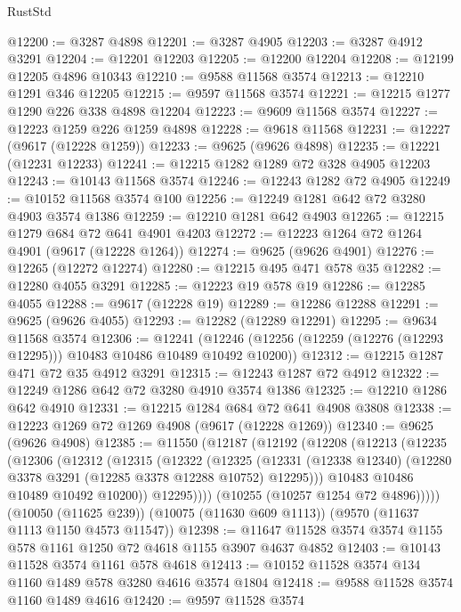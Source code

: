\begin{lexlean}{RustStd}
\begin{coremodule}
@12200 := @3287 @4898
@12201 := @3287 @4905
@12203 := @3287 @4912 @3291
@12204 := @12201 @12203
@12205 := @12200 @12204
@12208 := @12199 @12205 @4896 @10343
@12210 := @9588 @11568 @3574
@12213 := @12210 @1291 @346 @12205
@12215 := @9597 @11568 @3574
@12221 := @12215 @1277 @1290 @226 @338 @4898 @12204
@12223 := @9609 @11568 @3574
@12227 := @12223 @1259 @226 @1259 @4898
@12228 := @9618 @11568
@12231 := @12227 (@9617 (@12228 @1259))
@12233 := @9625 (@9626 @4898)
@12235 := @12221 (@12231 @12233)
@12241 := @12215 @1282 @1289 @72 @328 @4905 @12203
@12243 := @10143 @11568 @3574
@12246 := @12243 @1282 @72 @4905
@12249 := @10152 @11568 @3574 @100
@12256 := @12249 @1281 @642 @72 @3280 @4903 @3574 @1386
@12259 := @12210 @1281 @642 @4903
@12265 := @12215 @1279 @684 @72 @641 @4901 @4203
@12272 := @12223 @1264 @72 @1264 @4901 (@9617 (@12228 @1264))
@12274 := @9625 (@9626 @4901)
@12276 := @12265 (@12272 @12274)
@12280 := @12215 @495 @471 @578 @35
@12282 := @12280 @4055 @3291
@12285 := @12223 @19 @578 @19
@12286 := @12285 @4055
@12288 := @9617 (@12228 @19)
@12289 := @12286 @12288
@12291 := @9625 (@9626 @4055)
@12293 := @12282 (@12289 @12291)
@12295 := @9634 @11568 @3574
@12306 := @12241
    (@12246 (@12256 (@12259 (@12276 (@12293 @12295))) @10483 @10486 @10489 @10492 @10200))
@12312 := @12215 @1287 @471 @72 @35 @4912 @3291
@12315 := @12243 @1287 @72 @4912
@12322 := @12249 @1286 @642 @72 @3280 @4910 @3574 @1386
@12325 := @12210 @1286 @642 @4910
@12331 := @12215 @1284 @684 @72 @641 @4908 @3808
@12338 := @12223 @1269 @72 @1269 @4908 (@9617 (@12228 @1269))
@12340 := @9625 (@9626 @4908)
@12385 := @11550
    (@12187
      (@12192
        (@12208
          (@12213
            (@12235
              (@12306
                (@12312
                  (@12315
                    (@12322
                      (@12325
                        (@12331
                          (@12338 @12340)
                          (@12280 @3378 @3291 (@12285 @3378 @12288 @10752) @12295)))
                      @10483
                      @10486
                      @10489
                      @10492
                      @10200))
                  @12295))))
          (@10255 (@10257 @1254 @72 @4896)))))
    (@10050 (@11625 @239))
    (@10075 (@11630 @609 @1113))
    (@9570 (@11637 @1113 @1150 @4573 @11547))
@12398 := @11647 @11528 @3574 @3574 @1155 @578 @1161 @1250 @72 @4618 @1155 @3907 @4637 @4852
@12403 := @10143 @11528 @3574 @1161 @578 @4618
@12413 := @10152 @11528 @3574 @134 @1160 @1489 @578 @3280 @4616 @3574 @1804
@12418 := @9588 @11528 @3574 @1160 @1489 @4616
@12420 := @9597 @11528 @3574

\end{coremodule}
\end{lexlean}
